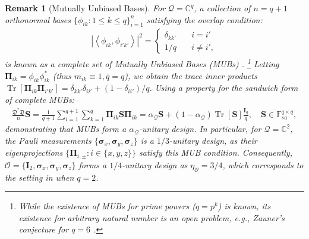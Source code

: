 \documentclass[noinfoline]{imsart}\setcounter{tocdepth}{2}
\renewcommand{\b}[1]{\mathbb{#1}} %
\newcommand{\m}[1]{\mathbf{#1}} %
\newcommand{\s}[1]{\mathscr{#1}} %
\newcommand{\f}[1]{\mathfrak{#1}} %
\renewcommand{\c}[1]{\mathcal{#1}} %
\newcommand{\mb}[1]{\boldsymbol{#1}} %
\newcommand{\tr}[1]{\operatorname{Tr}\left[#1\right]}
\newcommand{\innpr}[2]{{\left\langle {#1},{#2}\right\rangle}} %
\theoremstyle{plain}
\newtheorem{remark}[theorem]{Remark}
\begin{document}
\begin{remark}[Mutually Unbiased Bases]\label{rmk:MUB}
For $\c{Q} = \b{C}^{q}$, a collection of $n =  q+1$ orthonormal bases $\{\phi_{ik} : 1 \le k \le q\}_{i=1}^{n}$ satisfying the overlap condition:
\begin{align*}
    |\innpr{\phi_{ik}}{\phi_{i'k'}}|^2 = \begin{cases} 
    \delta_{kk'}  & \quad i=i' \\
    1/q & \quad i \ne i',
    \end{cases}
\end{align*}
is known as a complete set of Mutually Unbiased Bases (MUBs) \cite{klappenecker2005mutually}. \footnote{While the existence of MUBs for prime powers ($q=p^{k}$) is known, its existence for arbitrary natural number is an open problem, e.g., Zauner's conjecture for $q=6$ \cite{zauner1999grundzuge}.}
Letting $\m{\Pi}_{ik} = \phi_{ik} \phi_{ik}^{*}$ (thus $m_{ik} \equiv 1, \bar{q} = q$), we obtain the trace inner products $\tr{\m{\Pi}_{ik} \m{\Pi}_{i'k'}} = \delta_{kk'} \delta_{ii'} + (1-\delta_{ii'})/q$. Using a property for the sandwich form of complete MUBs:
\begin{align*} 
    \frac{\f{D}^{*} \f{D}}{n} \m{S} = \frac{1}{q+1} \sum_{i=1}^{q+1} \sum_{k=1}^{q} \m{\Pi}_{ik} \m{S} \m{\Pi}_{ik} = \alpha_{\c{Q}} \m{S} + (1-\alpha_{\c{Q}}) \tr{\m{S}} \frac{\m{I}_{q}}{q} , \quad \m{S} \in \b{F}_{sa}^{q \times q},
\end{align*}  
demonstrating that MUBs form a $\alpha_{\c{Q}}$-unitary design. In particular, for $\c{Q} = \b{C}^{2}$, the Pauli measurements $\{\mb{\sigma}_{x}, \mb{\sigma}_{y}, \mb{\sigma}_{z}\}$ is a $1/3$-unitary design, as their eigenprojections $\{\m{\Pi}_{i, \pm}: i \in \{x, y, z\}\}$ satisfy this MUB condition. 
Consequently, $\s{O} = \{\m{I}_{2}, \mb{\sigma}_{x}, \mb{\sigma}_{y}, \mb{\sigma}_{z}\}$ forms a $1/4$-unitary design as $\eta_{\s{O}} = 3/4$, which corresponds to the setting in \cite{cai2016optimal,gross2010quantum} when $q=2$.
\end{remark}
\end{document}

